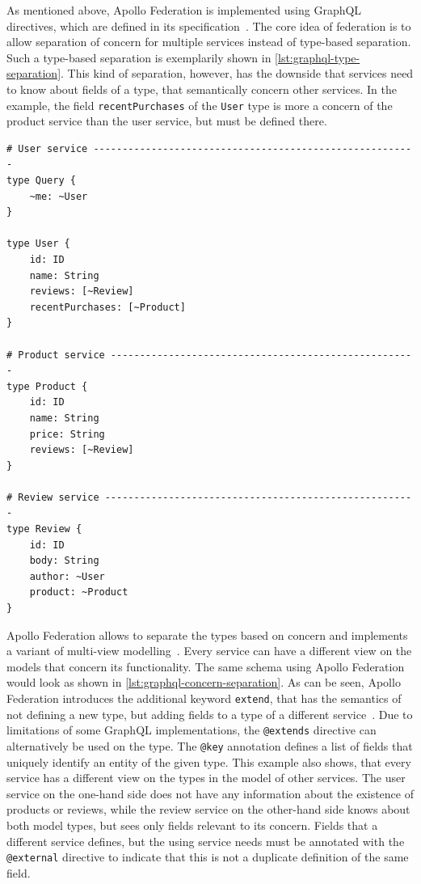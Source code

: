 As mentioned above, Apollo Federation is implemented using GraphQL directives, which are defined in its specification~\cite{MDGa}.
The core idea of federation is to allow separation of concern for multiple services instead of type-based separation.
Such a type-based separation is exemplarily shown in \autoref{lst:graphql-type-separation}.
This kind of separation, however, has the downside that services need to know about fields of a type, that semantically concern other services.
In the example, the field \texttt{recentPurchases} of the \texttt{User} type is more a concern of the product service than the user service, but must be defined there.

\begin{lstlisting}[language=graphqls, caption={Type-based Separation in GraphQL Schemas~\cite{MDG}}, label={lst:graphql-type-separation}]
# User service --------------------------------------------------------
type Query {
    ~me: ~User
}

type User {
    id: ID
    name: String
    reviews: [~Review]
    recentPurchases: [~Product]
}

# Product service -----------------------------------------------------
type Product {
    id: ID
    name: String
    price: String
    reviews: [~Review]
}

# Review service ------------------------------------------------------
type Review {
    id: ID
    body: String
    author: ~User
    product: ~Product
}
\end{lstlisting}

Apollo Federation allows to separate the types based on concern and implements a variant of multi-view modelling~\cite{MDG, Stuenkel2020}.
Every service can have a different view on the models that concern its functionality.
The same schema using Apollo Federation would look as shown in \autoref{lst:graphql-concern-separation}.
As can be seen, Apollo Federation introduces the additional keyword \texttt{extend}, that has the semantics of not defining a new type, but adding fields to a type of a different service~\cite{MDG}.
Due to limitations of some GraphQL implementations, the \texttt{@extends} directive can alternatively be used on the type.
The \texttt{@key} annotation defines a list of fields that uniquely identify an entity of the given type.
This example also shows, that every service has a different view on the types in the model of other services.
The user service on the one-hand side does not have any information about the existence of products or reviews, while the review service on the other-hand side knows about both model types, but sees only fields relevant to its concern.
Fields that a different service defines, but the using service needs must be annotated with the \texttt{@external} directive to indicate that this is not a duplicate definition of the same field.


